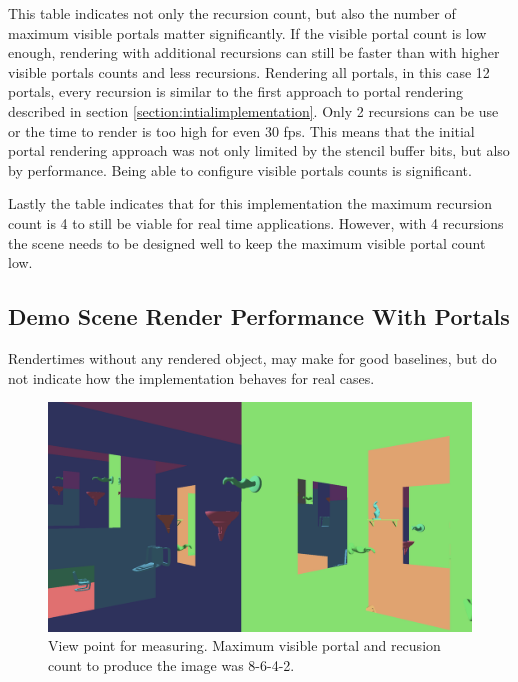 This table indicates not only the recursion count, but also the number of maximum visible portals matter significantly. If the visible portal count is low enough, rendering with additional recursions can still be faster than with higher visible portals counts and less recursions. Rendering all portals, in this case 12 portals, every recursion is similar to the first approach to portal rendering described in section \ref{section:intialimplementation}. Only 2 recursions can be use or the time to render is too high for even 30 \gls{fps}. This means that the initial portal rendering approach was not only limited by the stencil buffer bits, but also by performance. Being able to configure visible portals counts is significant.

Lastly the table indicates that for this implementation the maximum recursion count is 4 to still be viable for real time applications. However, with 4 recursions the scene needs to be designed well to keep the maximum visible portal count low.






\subsection{Demo Scene Render Performance With Portals}
\label{section:renderperformance}

Rendertimes without any rendered object, may make for good baselines, but do not indicate how the implementation behaves for real cases.  

\begin{figure}[H]
	\includegraphics[width=\linewidth]{images/testsnapshot.png}
	\caption{View point for measuring. Maximum visible portal and recusion count to produce the image was 8-6-4-2.}
	\label{fig:perfviewpoint}
\end{figure}

